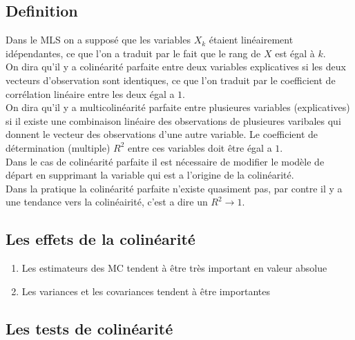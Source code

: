 \documentclass{article}
\begin{document}
\subsection{Definition}
Dans le MLS on a supposé que les variables $X_{k}$ étaient linéairement idépendantes, ce que l'on a
traduit par le fait que le rang de $X$ est égal à $k$.\\
On dira qu'il y a colinéarité parfaite entre deux variables explicatives si les deux vecteurs d'observation sont identiques, ce que
l'on traduit par le coefficient de corrélation linéaire entre les deux égal a $1$.\\ 
On dira qu'il y a multicolinéarité parfaite entre plusieures variables (explicatives) si il existe une
combinaison linéaire des observations de plusieures varibales qui donnent le vecteur des
observations d'une autre variable. Le coefficient de détermination (multiple) $R^2$ entre ces variables
doit être égal a $1$. \\
Dans le cas de colinéarité parfaite il est nécessaire de modifier le modèle de départ en
supprimant la variable qui est a l'origine de la colinéarité. \\
Dans la pratique la colinéarité parfaite n'existe quasiment pas, par contre il y a une
tendance vers la colinéairité, c'est a dire un $R^2 \rightarrow 1$.
\subsection{Les effets de la colinéarité}
\begin{enumerate}
    \item Les estimateurs des MC tendent à être très important en valeur absolue
    \item Les variances et les covariances tendent à être importantes
\end{enumerate}
\subsection{Les tests de colinéarité}
\end{document}
